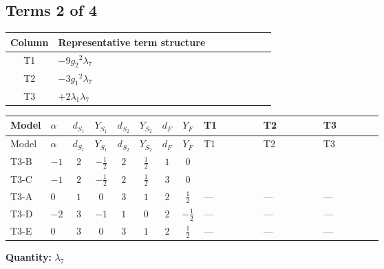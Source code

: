 \documentclass[8pt]{article}
\begin{document}
\begin{landscape}
\subsection*{Terms 2 of 4}
\begin{center}
\begin{tabular}{@{}c >{\raggedright\arraybackslash}p{0.82\linewidth}@{}}
\toprule
Column & Representative term structure \\
\midrule
T1 & \(\displaystyle -9 {g_2}^2 {\lambda_7}\) \\
\midrule
T2 & \(\displaystyle -3 {g_1}^2 {\lambda_7}\) \\
\midrule
T3 & \(\displaystyle +2 {\lambda_1} {\lambda_7}\) \\
\midrule
\bottomrule
\end{tabular}
\end{center}
\smallskip
\tiny
\begin{longtable}{@{}llcccccc >{\raggedright\arraybackslash}p{0.21\linewidth} >{\raggedright\arraybackslash}p{0.21\linewidth} >{\raggedright\arraybackslash}p{0.21\linewidth}@{}}
\toprule
Model & $\alpha$ & $d_{S_1}$ & $Y_{S_1}$ & $d_{S_2}$ & $Y_{S_2}$ & $d_F$ & $Y_F$ & T1 & T2 & T3 \\
\midrule
\endfirsthead
\toprule
Model & $\alpha$ & $d_{S_1}$ & $Y_{S_1}$ & $d_{S_2}$ & $Y_{S_2}$ & $d_F$ & $Y_F$ & T1 & T2 & T3 \\
\midrule
\endhead
T3-B & $-1$ & $2$ & $-\frac{1}{2}$ & $2$ & $\frac{1}{2}$ & $1$ & $0$ & \scriptsize\adjustbox{max width=\linewidth}{$\begin{gathered} -9 {g_2}^2 {\lambda_7}\end{gathered}$} & \scriptsize\adjustbox{max width=\linewidth}{$\begin{gathered} -3 {g_1}^2 {\lambda_7}\end{gathered}$} & \scriptsize\adjustbox{max width=\linewidth}{$\begin{gathered} +2 {\lambda_1} {\lambda_7}\end{gathered}$} \\
\midrule
T3-C & $-1$ & $2$ & $-\frac{1}{2}$ & $2$ & $\frac{1}{2}$ & $3$ & $0$ & \scriptsize\adjustbox{max width=\linewidth}{$\begin{gathered} -9 {g_2}^2 {\lambda_7}\end{gathered}$} & \scriptsize\adjustbox{max width=\linewidth}{$\begin{gathered} -3 {g_1}^2 {\lambda_7}\end{gathered}$} & \scriptsize\adjustbox{max width=\linewidth}{$\begin{gathered} +2 {\lambda_1} {\lambda_7}\end{gathered}$} \\
\midrule
T3-A & $0$ & $1$ & $0$ & $3$ & $1$ & $2$ & $\frac{1}{2}$ & --- & --- & --- \\
\midrule
T3-D & $-2$ & $3$ & $-1$ & $1$ & $0$ & $2$ & $-\frac{1}{2}$ & --- & --- & --- \\
\midrule
T3-E & $0$ & $3$ & $0$ & $3$ & $1$ & $2$ & $\frac{1}{2}$ & --- & --- & --- \\
\midrule
\bottomrule
\end{longtable}
\clearpage
\noindent\textbf{Quantity: }$\lambda_{7}$\par\smallskip

\end{landscape}
\end{document}
